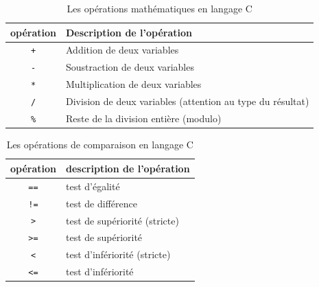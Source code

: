 \documentclass[a4paper,11pt]{book}
\theoremstyle{definition}
\begin{document}
\begin{table}[!t]
\centering
\begin{tabular}{cp{10cm}}
  \hline
  \textbf{opération} & Description de l'opération\\
  \hline
  \texttt{+}\index{+} & Addition de deux variables \\
  \texttt{-}\index{-} & Soustraction de deux variables \\
  \texttt{*}\index{*} & Multiplication de deux variables \\
  \texttt{/}\index{/} & Division de deux variables (attention au type du résultat)\\
  \texttt{\%}\index{\%} & Reste de la division entière (modulo)  \\
  \hline
\end{tabular}
\caption{Les opérations mathématiques en langage C\label{op_math}}
\end{table}
\begin{table}[!t]
\centering
\begin{tabular}{cp{10cm}}
  \hline
  \textbf{opération} & description de l'opération \\
  \hline
  \texttt{==}\index{++} & test d'égalité \\
  \texttt{!=}\index{!=} & test de différence \\
  \texttt{>}\index{>} & test de supériorité (stricte) \\
  \texttt{>=}\index{>=} & test de supériorité \\
  \texttt{<}\index{<} & test d'infériorité (stricte)\\
  \texttt{<=}\index{<=} & test d'infériorité\\
  \hline
\end{tabular}
\caption{Les opérations de comparaison en langage C\label{op_comp}}
\end{table}
\end{document}
